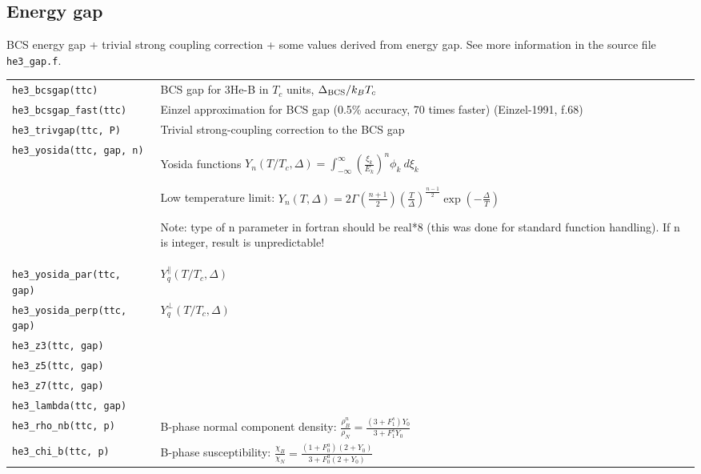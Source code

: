 \documentclass[a4paper]{article}
\begin{document}
{\small}

\eject
\subsection*{Energy gap}

BCS energy gap + trivial strong coupling correction + some values
derived from energy gap. See more information in the
source file {\tt he3\_gap.f}.

\medskip
\noindent\begin{tabular}{lp{11cm}}
\tt he3\_bcsgap(ttc)       & BCS gap for 3He-B in $T_c$ units, $\Delta_{\rm BCS}/ k_B T_c$\\
\tt he3\_bcsgap\_fast(ttc) & Einzel approximation for BCS gap (0.5\% accuracy, 70 times faster)\newline
                             {\small(Einzel-1991, f.68)}\\
\tt he3\_trivgap(ttc, P)   & Trivial strong-coupling correction to the BCS gap\\
\tt he3\_yosida(ttc, gap, n) & Yosida functions $\displaystyle Y_n(T/T_c,\Delta) =
                               \int_{-\infty}^{\infty} \left(\frac{\xi_k}{E_k}\right)^n
                               \phi_k\ d\xi_k$\par
                               Low temperature limit:
                               $\displaystyle Y_n(T,\Delta) =
                               2\Gamma\left(\frac{n+1}{2}\right)
                               \left(\frac{T}{\Delta}\right)^{\frac{n-1}{2}}
                               \exp\left(-\frac{\Delta}{T}\right)$\par
                               Note: type of n parameter in fortran should be real*8 (this was done
                               for standard function handling). If n is integer, result is unpredictable!\\
\tt he3\_yosida\_par(ttc, gap)  & $Y_q^\parallel(T/T_c,\Delta)$\\
\tt he3\_yosida\_perp(ttc, gap) & $Y_q^\perp(T/T_c,\Delta)$\\

\tt he3\_z3(ttc, gap) &\\
\tt he3\_z5(ttc, gap) &\\
\tt he3\_z7(ttc, gap) &\\
\tt he3\_lambda(ttc, gap) &\\

\tt he3\_rho\_nb(ttc, p)     &B-phase normal component density:
                             $\displaystyle \frac{\rho_B^n}{\rho_{N}} =
                               \frac{(3 + F_1^s) Y_0}{3 + F_1^s Y_0}$\\[3mm]
\tt he3\_chi\_b(ttc, p)      &B-phase susceptibility:
                             $\displaystyle \frac{\chi_B}{\chi_N} =
                               \frac{(1+F_0^a)(2 + Y_0)}
                                     {3+F_0^a(2 + Y_0)}$\\
\end{tabular}
\medskip
\end{document}
